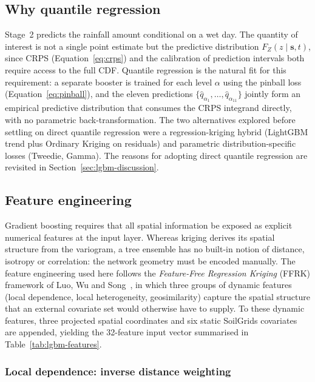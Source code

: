 \subsection{Why quantile regression}
\label{sec:lgbm-why-quantile}

Stage~2 predicts the rainfall amount conditional on a wet day. The
quantity of interest is not a single point estimate but the predictive
distribution $F_Z(z \mid \mathbf{s}, t)$, since CRPS
(Equation~\eqref{eq:crps}) and the calibration of prediction intervals
both require access to the full CDF. Quantile regression is the
natural fit for this requirement: a separate booster is trained for
each level $\alpha$ using the pinball loss
(Equation~\eqref{eq:pinball}), and the eleven predictions
$\{\hat{q}_{\alpha_1}, \ldots, \hat{q}_{\alpha_{11}}\}$ jointly form
an empirical predictive distribution that consumes the CRPS integrand
directly, with no parametric back-transformation. The two
alternatives explored before settling on direct quantile regression
were a regression-kriging hybrid (LightGBM trend plus Ordinary
Kriging on residuals) and parametric distribution-specific losses
(Tweedie, Gamma). The reasons for adopting direct quantile regression
are revisited in Section~\ref{sec:lgbm-discussion}.

\subsection{Feature engineering}
\label{sec:lgbm-features}

Gradient boosting requires that all spatial information be exposed as
explicit numerical features at the input layer. Whereas kriging
derives its spatial structure from the variogram, a tree ensemble has
no built-in notion of distance, isotropy or correlation: the network
geometry must be encoded manually. The feature engineering used here
follows the \emph{Feature-Free Regression Kriging} (FFRK) framework
of Luo, Wu and Song~\cite{luo2025featurefree}, in which three groups
of dynamic features (local dependence, local heterogeneity,
geosimilarity) capture the spatial structure that an external
covariate set would otherwise have to supply. To these dynamic
features, three projected spatial coordinates and six static
SoilGrids covariates are appended, yielding the 32-feature input
vector summarised in Table~\ref{tab:lgbm-features}.

\subsubsection*{Local dependence: inverse distance weighting}
\label{sec:lgbm-idw}

